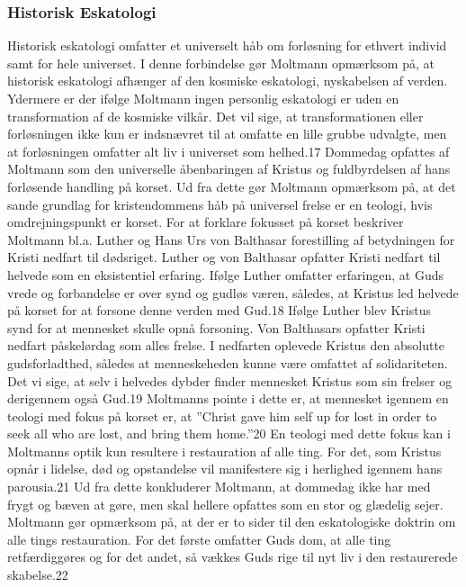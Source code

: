 \subsubsection{Historisk Eskatologi} 
Historisk eskatologi omfatter et universelt håb om forløsning for ethvert individ samt for hele universet. I denne forbindelse gør Moltmann opmærksom på, at historisk eskatologi afhænger af den kosmiske eskatologi, nyskabelsen af verden. Ydermere er der ifølge Moltmann ingen personlig eskatologi er uden en transformation af de kosmiske vilkår. Det vil sige, at transformationen eller forløsningen ikke kun er indsnævret til at omfatte en lille grubbe udvalgte, men at forløsningen omfatter alt liv i universet som helhed.17 Dommedag opfattes af Moltmann som den universelle åbenbaringen af Kristus og fuldbyrdelsen af hans forløsende handling på korset. Ud fra dette gør Moltmann opmærksom på, at det sande grundlag for kristendommens håb på universel frelse er en teologi, hvis omdrejningspunkt er korset. For at forklare fokusset på korset beskriver Moltmann bl.a. Luther og Hans Urs von Balthasar forestilling af betydningen for Kristi nedfart til dødsriget. Luther og von Balthasar opfatter Kristi nedfart til helvede som en eksistentiel erfaring. Ifølge Luther omfatter erfaringen, at Guds vrede og forbandelse er over synd og gudløs væren, således, at Kristus led helvede på korset for at forsone denne verden med Gud.18 Ifølge Luther blev Kristus synd for at mennesket skulle opnå forsoning. Von Balthasars opfatter Kristi nedfart påskelørdag som alles frelse. I nedfarten oplevede Kristus den absolutte gudsforladthed, således at menneskeheden kunne være omfattet af solidariteten. Det vi sige, at selv i helvedes dybder finder mennesket Kristus som sin frelser og derigennem også Gud.19 Moltmanns pointe i dette er, at mennesket igennem en teologi med fokus på korset er, at ”Christ gave him self up for lost in order to seek all who are lost, and bring them home.”20 En teologi med dette fokus kan i Moltmanns optik kun resultere i restauration af alle ting. For det, som Kristus opnår i lidelse, død og opstandelse vil manifestere sig i herlighed igennem hans parousia.21 Ud fra dette konkluderer Moltmann, at dommedag ikke har med frygt og bæven at gøre, men skal hellere opfattes som en stor og glædelig sejer. Moltmann gør opmærksom på, at der er to sider til den eskatologiske doktrin om alle tings restauration. For det første omfatter Guds dom, at alle ting retfærdiggøres og for det andet, så vækkes Guds rige til nyt liv i den restaurerede skabelse.22
